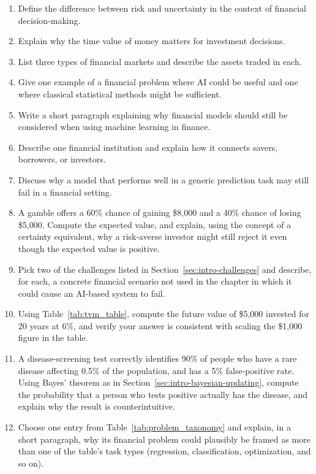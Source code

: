 \documentclass[../ai_in_finance]{subfiles}
\begin{document}
\begin{enumerate}[exercises]
    \item Define the difference between risk and uncertainty in the context of financial decision-making.
    \item Explain why the time value of money matters for investment decisions.
    \item List three types of financial markets and describe the assets traded in each.
    \item Give one example of a financial problem where AI could be useful and one where classical statistical methods might be sufficient.
    \item Write a short paragraph explaining why financial models should still be considered when using machine learning in finance.
    \item Describe one financial institution and explain how it connects savers, borrowers, or investors.
    \item Discuss why a model that performs well in a generic prediction task may still fail in a financial setting.
    \item A gamble offers a 60\% chance of gaining \$8,000 and a 40\% chance of losing \$5,000. Compute the expected value, and explain, using the concept of a certainty equivalent, why a risk-averse investor might still reject it even though the expected value is positive.
    \item Pick two of the challenges listed in Section~\ref{sec:intro-challenges} and describe, for each, a concrete financial scenario not used in the chapter in which it could cause an AI-based system to fail.
    \item Using Table~\ref{tab:tvm_table}, compute the future value of \$5,000 invested for 20 years at 6\%, and verify your answer is consistent with scaling the \$1,000 figure in the table.
    \item A disease-screening test correctly identifies 90\% of people who have a rare disease affecting 0.5\% of the population, and has a 5\% false-positive rate. Using Bayes' theorem as in Section~\ref{sec:intro-bayesian-updating}, compute the probability that a person who tests positive actually has the disease, and explain why the result is counterintuitive.
    \item Choose one entry from Table~\ref{tab:problem_taxonomy} and explain, in a short paragraph, why its financial problem could plausibly be framed as more than one of the table's task types (regression, classification, optimization, and so on).

\end{enumerate}
\end{document}
